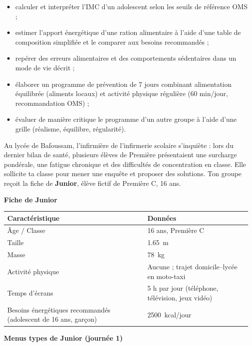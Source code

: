 \documentclass[11pt]{article}
\newcommand{\cle}[1]{{\popxbold\color{popdark}#1}}
\newcounter{popsec}
\newcounter{popsub}
\newcommand{\courssub}[1]{%
  \stepcounter{popsub}%
  \par\vspace{9pt}\noindent{\popxbold\fontsize{11.5}{13}\selectfont\color{popink}{\color{poporange}\thepopsec.\thepopsub}\hspace{6pt}#1}\par\nopagebreak\vspace{4pt}
}
\begin{document}
\begin{itemize}
\item calculer et interpréter l'\cle{IMC} d'un adolescent selon les seuils de référence OMS ;
\item estimer l'apport énergétique d'une ration alimentaire à l'aide d'une table de composition simplifiée et le comparer aux besoins recommandés ;
\item repérer des erreurs alimentaires et des comportements sédentaires dans un mode de vie décrit ;
\item élaborer un programme de prévention de 7 jours combinant alimentation équilibrée (aliments locaux) et activité physique régulière (60 min/jour, recommandation OMS) ;
\item évaluer de manière critique le programme d'un autre groupe à l'aide d'une grille (réalisme, équilibre, régularité).
\end{itemize}

\courssub{Situation déclenchante}

Au lycée de Bafoussam, l'infirmière de l'infirmerie scolaire s'inquiète : lors du dernier bilan de santé, plusieurs élèves de Première présentaient une surcharge pondérale, une fatigue chronique et des difficultés de concentration en classe. Elle sollicite ta classe pour mener une enquête et proposer des solutions. Ton groupe reçoit la fiche de \textbf{Junior}, élève fictif de Première C, 16 ans.

\textbf{Fiche de Junior}

\begin{center}
\begin{tabularx}{\linewidth}{|l|X|}
\hline
\rowcolor{popblueL} \textbf{Caractéristique} & \textbf{Données} \\
\hline
Âge / Classe & 16 ans, Première C \\
\hline
Taille & \SI{1,65}{m} \\
\hline
Masse & \SI{78}{kg} \\
\hline
Activité physique & Aucune ; trajet domicile--lycée en moto-taxi \\
\hline
Temps d'écrans & 5 h par jour (téléphone, télévision, jeux vidéo) \\
\hline
Besoins énergétiques recommandés (adolescent de 16 ans, garçon) & \SI{2500}{kcal/jour} \\
\hline
\end{tabularx}
\end{center}

\textbf{Menus types de Junior (journée 1)}
\end{document}
